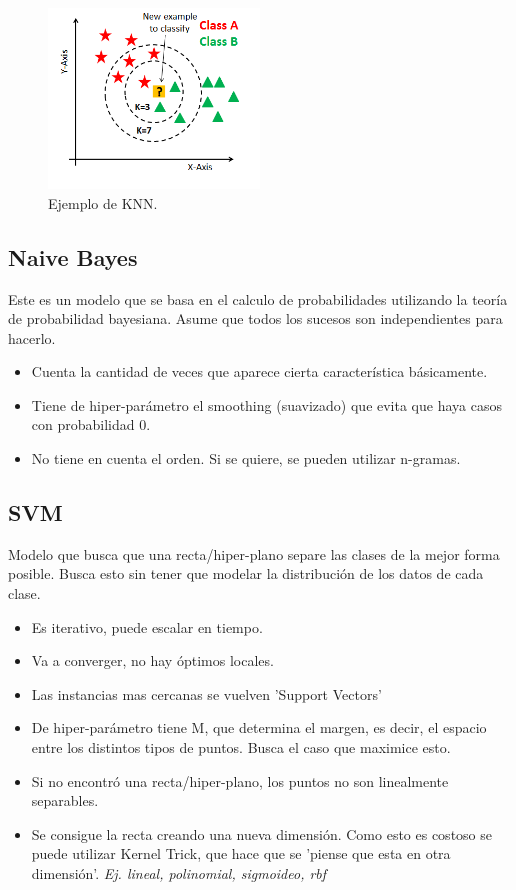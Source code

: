 \documentclass[titlepage,a4paper]{article}
\begin{document}
\begin{figure}[!htb]
    \centering
    \includegraphics[width=0.5\textwidth]{imagenesResumen/KNN.png}
    \caption{Ejemplo de KNN.}
\end{figure}


\subsection{Naive Bayes}
Este es un modelo que se basa en el calculo de probabilidades utilizando la teoría de probabilidad bayesiana. Asume que todos los sucesos son independientes para hacerlo.

\begin{itemize}
    \item Cuenta la cantidad de veces que aparece cierta característica básicamente.
    \item Tiene de hiper-parámetro el smoothing (suavizado) que evita que haya casos con probabilidad 0.
    \item No tiene en cuenta el orden. Si se quiere, se pueden utilizar n-gramas.
    
\end{itemize}

\newpage

\subsection{SVM}

Modelo que busca que una recta/hiper-plano separe las clases de la mejor forma posible. Busca esto sin tener que modelar la distribución de los datos de cada clase.

\begin{itemize}
    \item Es iterativo, puede escalar en tiempo.
    \item Va a converger, no hay óptimos locales.
    \item Las instancias mas cercanas se vuelven 'Support Vectors'
    \item De hiper-parámetro tiene M, que determina el margen, es decir, el espacio entre los distintos tipos de puntos. Busca el caso que maximice esto.
    \item Si no encontró una recta/hiper-plano, los puntos no son linealmente separables.
    \item Se consigue la recta creando una nueva dimensión. Como esto es costoso se puede utilizar Kernel Trick, que hace que se 'piense que esta en otra dimensión'. \textit{Ej. lineal, polinomial, sigmoideo, rbf}
\end{itemize}
\end{document}
